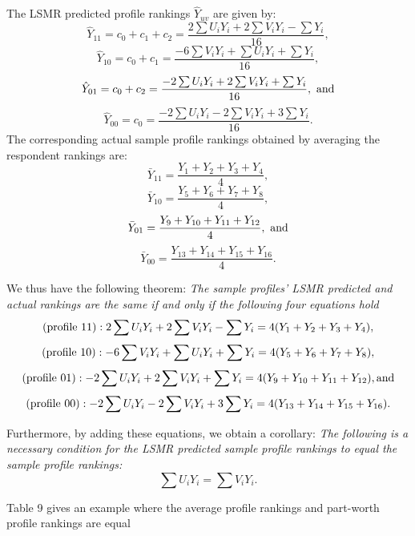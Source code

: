 \documentclass[a4paper, 12pt]{article}
\begin{document}
The LSMR predicted profile rankings $ \hat{Y}_{uv}$  are given by: 
$$\hat{Y}_{11} = c_0 + c_1 + c_2 = 
\frac{2\sum U_iY_i + 2\sum V_iY_i - \sum Y_i}{16},$$
$$\hat{Y}_{10} = c_0 + c_1 = 
\frac{-6 \sum V_iY_i + \sum U_iY_i + \sum Y_i}{16},$$
$$\hat{Y}_{01} = c_0 + c_2 = 
\frac{-2\sum U_iY_i + 2\sum V_iY_i + \sum Y_i}{16}, \textup{  and}$$ 
$$\hat{Y}_{00} = c_0 = 
\frac{-2\sum U_iY_i - 2\sum V_iY_i +3 \sum Y_i}{16}.$$
The corresponding actual sample profile rankings obtained by averaging the respondent rankings are:
$$\bar{Y}_{11} = \frac{Y_1+Y_2+Y_3+Y_4}{4},$$
$$\bar{Y}_{10} = \frac{Y_5+Y_6+Y_7+Y_8}{4},$$
$$\bar{Y}_{01} = \frac{Y_9+Y_{10}+Y_{11}+Y_{12}}{4}, \textup{  and}$$
$$\bar{Y}_{00} = \frac{Y_{13}+Y_{14}+Y_{15}+Y_{16}}{4}.$$


{\flushleft We} thus have the following theorem: \emph{The sample profiles' LSMR predicted and actual rankings are the same if and only if the following four equations hold}
\begin{equation}
\textup{(profile 11)} :  2\sum U_iY_i + 2\sum V_iY_i - \sum Y_i = 4( Y_1+Y_2+Y_3+Y_4 ),
\end{equation}
\label{eq:14}
\begin{equation}
\textup{(profile 10)} :  -6 \sum V_iY_i + \sum U_iY_i + \sum Y_i = 4( Y_5+Y_6+Y_7+Y_8 ),
\end{equation}
\label{eq:15}
\begin{equation}
\textup{(profile 01)} : -2\sum U_iY_i + 2\sum V_iY_i + \sum Y_i = 4(Y_9+Y_{10}+Y_{11}+Y_{12} ), \textup{and}
\end{equation}
\label{eq:16}
\begin{equation}
\textup{(profile 00)} : -2\sum U_iY_i - 2\sum V_iY_i +3 \sum Y_i = 4(Y_{13}+Y_{14}+Y_{15}+Y_{16} ).
\end{equation}
\label{eq:17}

{\flushleft Furthermore}, by adding these equations, we obtain a corollary:
\emph{The following is a necessary condition for the LSMR predicted sample profile rankings to equal the sample profile rankings:}
\begin{equation}
\sum U_iY_i = \sum V_iY_i.
\label{cor}
\end{equation}


Table 9 gives an example where the average profile rankings and part-worth profile rankings are equal
\end{document}
